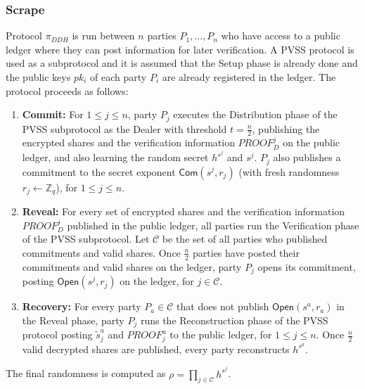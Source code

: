 \documentclass[11pt]{article}
\theoremstyle{definition}
\theoremstyle{remark}
\begin{document}
\subsubsection{Scrape}
Protocol $\pi_{DDH}$ is run between $n$ parties $P_1, ..., P_n$ who have access to a public ledger where they can post information for later verification. A PVSS protocol is used as a subprotocol and it is assumed that the Setup phase is already done and the public keys $pk_i$ of each party $P_i$ are already registered in the ledger. The protocol proceeds as follows:

\begin{enumerate}
\item \textbf{Commit:} For $1 \leq j \leq n$, party $P_j$ executes the Distribution phase of the PVSS subprotocol as the Dealer with threshold $t = \frac{n}{2}$, publishing the encrypted shares and the verification information $PROOF_D^j$ on the public ledger, and also learning the random secret $h^{s^j}$ and $s^j$. $P_j$ also publishes a commitment to the secret exponent $\mathsf{Com}(s^j, r_j)$ (with fresh randomness $r_j \leftarrow \mathbb{Z}_q$), for $1 \leq j \leq n$.
\item \textbf{Reveal:} For every set of encrypted shares and the verification information $PROOF_D^j$ published in the public ledger, all parties run the Verification phase of the PVSS subprotocol. Let $\mathcal{C}$ be the set of all parties who published commitments and valid shares. Once $\frac{n}{2}$ parties have posted their commitments and valid shares on the ledger, party $P_j$ opens its commitment, posting $\mathsf{Open}(s^j, r_j)$ on the ledger, for $j \in \mathcal{C}$.
\item \textbf{Recovery:} For every party $P_a \in \mathcal{C}$ that does not publish $\mathsf{Open}(s^a, r_a)$ in the Reveal phase, party $P_j$ runs the Reconstruction phase of the PVSS protocol posting $\tilde{s}_j^a$ and $PROOF_j^a$ to the public ledger, for $1 \leq j \leq n$. Once $\frac{n}{2}$ valid decrypted shares are published, every party reconstructs $h^{s^a}$.
\end{enumerate}

The final randomness is computed as $\rho = \prod_{j \in \mathcal{C}} h^{s^j}$.
\end{document}
